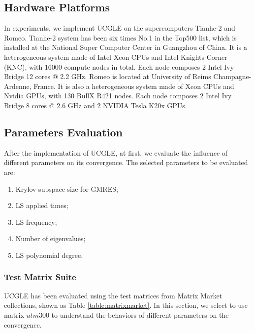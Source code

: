 \subsection{Hardware Platforms}

In experiments, we implement UCGLE on the supercomputers Tianhe-2 and Romeo. Tianhe-2 system has been six times No.1 in the Top500 list, which is installed at the National Super Computer Center in Guangzhou of China. It is a heterogeneous system made of Intel Xeon CPUs and Intel Knights Corner (KNC), with 16000 compute nodes in total. Each node composes 2 Intel Ivy Bridge 12 cores @ 2.2 GHz. Romeo is located at University of Reims Champagne-Ardenne, France. It is also a heterogeneous system made of Xeon CPUs and Nvidia GPUs, with 130 BullX R421 nodes. Each node composes 2 Intel Ivy Bridge 8 cores @ 2.6 GHz and 2 NVIDIA Tesla K20x GPUs.

\subsection{Parameters Evaluation}\label{Parameters Evaluation}

After the implementation of UCGLE, at first, we evaluate the influence of different parameters on its convergence. The selected parameters to be evaluated are:

\begin{enumerate}
	\item Krylov subspace size for GMRES;
	\item LS applied times;
	\item LS frequency;
	\item Number of eigenvalues;
	\item LS polynomial degree.
\end{enumerate}

\subsubsection{Test Matrix Suite}

UCGLE has been evaluated using the test matrices from Matrix Market collections, shown as Table \ref{table:matrixmarket}. In this section, we select to use matrix $utm300$ to understand the behaviors of different parameters on the convergence.


